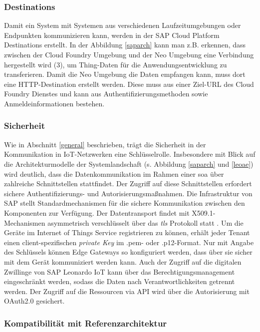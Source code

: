 \subsubsection{Destinations}

Damit ein System mit Systemen aus verschiedenen Laufzeitumgebungen oder Endpunkten kommunizieren kann, werden in der SAP Cloud Platform Destinations erstellt. In der Abbildung \ref{saparch} kann man z.B. erkennen, dass zwischen der Cloud Foundry Umgebung und der Neo Umgebung eine Verbindung hergestellt wird (3), um Thing-Daten für die Anwendungsentwicklung zu transferieren. Damit die Neo Umgebung die Daten empfangen kann, muss dort eine HTTP-Destination erstellt werden. Diese muss aus einer Ziel-URL des Cloud Foundry Dienstes und kann aus Authentifizierungsmethoden sowie Anmeldeinformationen bestehen.

\subsubsection{Sicherheit}

Wie in Abschnitt \ref{general} beschrieben, trägt die Sicherheit in der Kommunikation in IoT-Netzwerken eine Schlüsselrolle. Insbesondere mit Blick auf die Architekturmodelle der Systemlandschaft (s. Abbildung \ref{saparch} und \ref{leoae}) wird deutlich, dass die Datenkommunikation im Rahmen einer \ac{soa} über zahlreiche Schnittstellen stattfindet. Der Zugriff auf diese Schnittstellen erfordert sichere Authentifizierungs- und Autorisierungsmaßnahmen. Die Infrastruktur von SAP stellt Standardmechanismen für die sichere Kommunikation zwischen den Komponenten zur Verfügung. Der Datentransport findet mit X509.1-Mechanismen asymmetrisch verschlüsselt über das \textit{\ac{tls}} Protokoll statt \citep{SAP2020a}. Um die Geräte im Internet of Things Service registrieren zu können, erhält jeder Tenant einen client-spezifischen \textit{private Key} im .pem- oder .p12-Format. Nur mit Angabe des Schlüssels können Edge Gateways so konfiguriert werden, dass über sie sicher mit dem Gerät kommuniziert werden kann. Auch der Zugriff auf die digitalen Zwillinge von SAP Leonardo IoT kann über das Berechtigungsmanagement eingeschränkt werden, sodass die Daten nach Verantwortlichkeiten getrennt werden. Der Zugriff auf die Ressourcen via API wird über die Autorisierung mit OAuth2.0 gesichert.

\subsubsection{Kompatibilität mit Referenzarchitektur}

